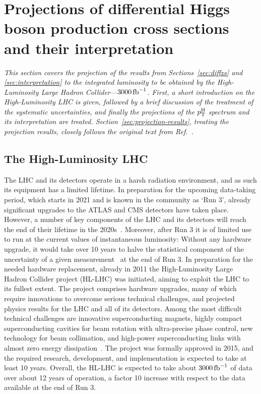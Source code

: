 \section{Projections of differential Higgs boson production cross sections and their interpretation}
\label{sec:projections}

\emph{%
This section covers the projection of the results from Sections~\ref{sec:diffxs} and \ref{sec:interpretation} to the integrated luminosity to be obtained by the High-Luminosity Large Hadron Collider---$3000\,\text{fb}^{-1}$.
% 
First, a short introduction on the High-Luminosity LHC is given, followed by a brief discussion of the treatment of the systematic uncertainties, and finally the projections of the $p_\mathrm{T}^\mathrm{H}$ spectrum and its interpretation are treated.
% 
Section~\ref{sec:projection-results}, treating the projection results, closely follows the original text from Ref.~\cite{CMS:2018qgz}.
}


\subsection{The High-Luminosity LHC}

The LHC and its detectors operate in a harsh radiation environment, and as such its equipment has a limited lifetime.
% 
In preparation for the upcoming data-taking period, which starts in 2021 and is known in the community as `Run 3', already significant upgrades to the ATLAS and CMS detectors have taken place.
% 
However, a number of key components of the LHC and its detectors will reach the end of their lifetime in the 2020s~\cite{hllhc}.
% 
Moreover, after Run 3 it is of limited use to run at the current values of instantaneous luminosity: Without any hardware upgrade, it would take over 10 years to halve the statistical component of the uncertainty of a given measurement~\cite{hllhc} at the end of Run 3.
% 
In preparation for the needed hardware replacement, already in 2011 the High-Luminosity Large Hadron Collider project (HL-LHC) was initiated, aiming to exploit the LHC to its fullest extent.
% 
The project comprises hardware upgrades, many of which require innovations to overcome serious technical challenges, and projected physics results for the LHC and all of its detectors.
% 
Among the most difficult technical challenges are innovative superconducting magnets, highly compact superconducting cavities for beam rotation with ultra-precise phase control, new technology for beam collimation, and high-power superconducting links with almost zero energy dissipation~\cite{hllhc}.
% 
The project was formally approved in 2015, and the required research, development, and implementation is expected to take at least 10 years.
% 
Overall, the HL-LHC is expected to take about $3000\,\text{fb}^{-1}$ of data over about 12 years of operation, a factor 10 increase with respect to the data available at the end of Run 3.


